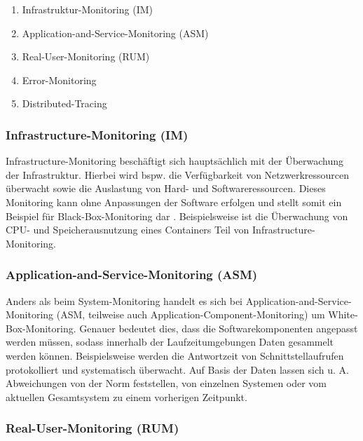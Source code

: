 \begin{enumerate}
	\item Infrastruktur-Monitoring (IM)
	\item Application-and-Service-Monitoring (ASM)
	\item Real-User-Monitoring (RUM)
	\item Error-Monitoring
	\item Distributed-Tracing
\end{enumerate}

\subsubsection{Infrastructure-Monitoring (IM)}

Infrastructure-Monitoring beschäftigt sich hauptsächlich mit der Überwachung der Infrastruktur. Hierbei wird bspw. die Verfügbarkeit von Netzwerkressourcen überwacht sowie die Auslastung von Hard- und Softwareressourcen. Dieses Monitoring kann ohne Anpassungen der Software erfolgen und stellt somit ein Beispiel für Black-Box-Monitoring dar \cite{ClientSideMonitoringOfDistributedSystems}. Beispielsweise ist die Überwachung von CPU- und Speicherausnutzung eines Containers Teil von Infrastructure-Monitoring.

\subsubsection{Application-and-Service-Monitoring (ASM)}

Anders als beim System-Monitoring handelt es sich bei Application-and-Service-Monitoring (ASM, teilweise auch Application-Component-Monitoring) um White-Box-Monitoring. Genauer bedeutet dies, dass die Softwarekomponenten angepasst werden müssen, sodass innerhalb der Laufzeitumgebungen Daten gesammelt werden können. Beispielsweise werden die Antwortzeit von Schnittstellaufrufen protokolliert und systematisch überwacht. Auf Basis der Daten lassen sich u. A. Abweichungen von der Norm feststellen, von einzelnen Systemen oder vom aktuellen Gesamtsystem zu einem vorherigen Zeitpunkt.

\subsubsection{Real-User-Monitoring (RUM)}


